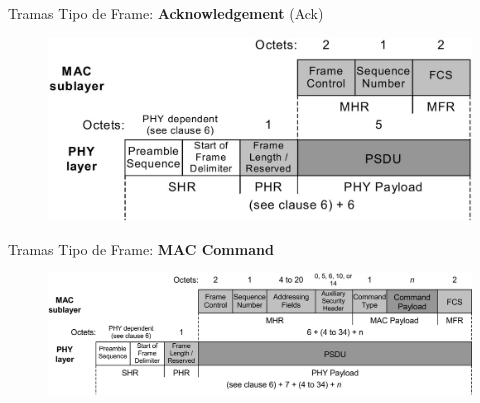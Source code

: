 \documentclass[aspectratio=169]{beamer}
\begin{document}
\begin{frame}[t]{Tramas}
Tipo de Frame: \textbf{Acknowledgement} (Ack)
\vspace{10px}
	\begin{figure}[H]
	\centering
		\includegraphics[width=.7\textwidth]{./imagenes/ack.jpg}
	\end{figure}	  	  	
\end{frame}

\begin{frame}[t]{Tramas}
Tipo de Frame: \textbf{MAC Command}
\vspace{10px}
	\begin{figure}[H]
		\includegraphics[width=1\textwidth]{./imagenes/maccommand.jpg}
	\end{figure}	  	  	
\end{frame}
\end{document}
